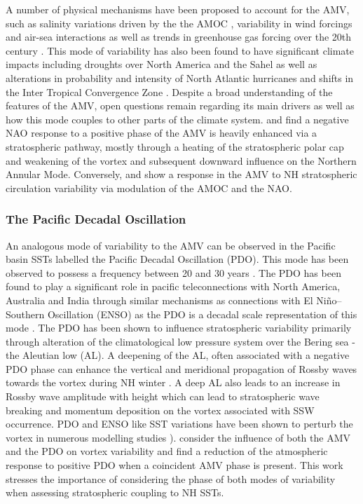 {A number of physical mechanisms have been proposed to account for the AMV, such as salinity variations driven by the the AMOC \citep{Kuhlbrodt2007}, variability in wind forcings and air-sea interactions \citep{Medhaug2011} as well as trends in greenhouse gas forcing over the 20th century \citep{Ottera2010,Booth2012,Knudsen2014}. This mode of variability has also been found to have significant climate impacts including droughts over North America and the Sahel as well as alterations in probability and intensity of North Atlantic hurricanes and shifts in the Inter Tropical Convergence Zone \citep{Zhang2006,Ting2011,Nigam2011}. Despite a broad understanding of the features of the AMV, open questions remain regarding its main drivers as well as how this mode couples to other parts of the climate system. \cite{Peings2016} and \cite{Omrani2014} find a negative NAO response to a positive phase of the AMV is heavily enhanced via a stratospheric pathway, mostly through a heating of the stratospheric polar cap and weakening of the vortex and subsequent downward influence on the Northern Annular Mode. Conversely, \cite{Reichler2012} and \cite{manziniStratospheretroposphere2012} show a response in the AMV to NH stratospheric circulation variability via modulation of the AMOC and the NAO. 

\subsubsection*{The Pacific Decadal Oscillation }
An analogous mode of variability to the AMV can be observed in the Pacific basin SSTs \citep{Mantua1997,Dong2015} labelled the Pacific Decadal Oscillation (PDO). This mode has been observed to possess a frequency between 20 and 30 years \citep{Henley2015}. The PDO has been found to play a significant role in pacific teleconnections with North America, Australia and India through similar mechanisms as connections with El Niño–Southern Oscillation (ENSO) as the PDO is a decadal scale representation of this mode \citep{Horel1981,Bahaga2019}. The PDO has been shown to influence stratospheric variability primarily through alteration of the climatological low pressure system over the Bering sea - the Aleutian low (AL). A deepening of the AL, often associated with a negative PDO phase can enhance the vertical and meridional propagation of Rossby waves towards the vortex during NH winter \citep{krenWintertime2016,Kang2017,huDecadal2018}. A deep AL also leads to an increase in Rossby wave amplitude with height \citep{Plumb2003} which can lead to stratospheric wave breaking and momentum deposition on the vortex associated with SSW occurrence. PDO and ENSO like SST variations have been shown to perturb the vortex in numerous modelling studies \citep{krenWintertime2016,Garcia-Herrera2006}). \cite{Elsbury2019} consider the influence of both the AMV and the PDO on vortex variability and find a reduction of the atmospheric response to positive PDO when a coincident AMV phase is present. This work stresses the importance of considering the phase of both modes of variability when assessing stratospheric coupling to NH SSTs. 

}
